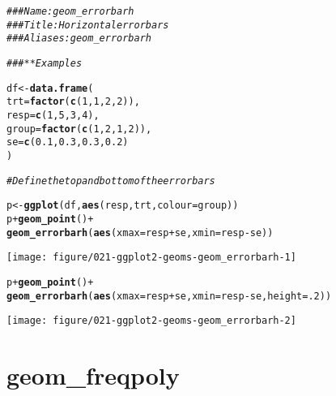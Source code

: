 \documentclass[a4paper,titlepage]{tufte-handout}\usepackage[]{graphicx}\usepackage[]{color}
\makeatletter
\def\maxwidth{ %
  \ifdim\Gin@nat@width>\linewidth
    \linewidth
  \else
    \Gin@nat@width
  \fi
}
\newcommand{\hlnum}[1]{\textcolor[rgb]{0.686,0.059,0.569}{#1}}%
\newcommand{\hlcom}[1]{\textcolor[rgb]{0.678,0.584,0.686}{\textit{#1}}}%
\newcommand{\hlopt}[1]{\textcolor[rgb]{0,0,0}{#1}}%
\newcommand{\hlstd}[1]{\textcolor[rgb]{0.345,0.345,0.345}{#1}}%
\newcommand{\hlkwb}[1]{\textcolor[rgb]{0.69,0.353,0.396}{#1}}%
\newcommand{\hlkwc}[1]{\textcolor[rgb]{0.333,0.667,0.333}{#1}}%
\newcommand{\hlkwd}[1]{\textcolor[rgb]{0.737,0.353,0.396}{\textbf{#1}}}%
\newenvironment{kframe}{%
 \def\at@end@of@kframe{}%
 \ifinner\ifhmode%
  \def\at@end@of@kframe{\end{minipage}}%
  \begin{minipage}{\columnwidth}%
 \fi\fi%
 \def\FrameCommand##1{\hskip\@totalleftmargin \hskip-\fboxsep
 \colorbox{shadecolor}{##1}\hskip-\fboxsep
     \hskip-\linewidth \hskip-\@totalleftmargin \hskip\columnwidth}%
 \MakeFramed {\advance\hsize-\width
   \@totalleftmargin\z@ \linewidth\hsize
   \@setminipage}}%
 {\par\unskip\endMakeFramed%
 \at@end@of@kframe}
\newenvironment{knitrout}{}{} %
\makeatother
\begin{document}
\begin{knitrout}
\color{fgcolor}\begin{kframe}
\begin{alltt}
\hlcom{### Name: geom_errorbarh}
\hlcom{### Title: Horizontal error bars}
\hlcom{### Aliases: geom_errorbarh}

\hlcom{### ** Examples}

\hlstd{df} \hlkwb{<-} \hlkwd{data.frame}\hlstd{(}
  \hlkwc{trt} \hlstd{=} \hlkwd{factor}\hlstd{(}\hlkwd{c}\hlstd{(}\hlnum{1}\hlstd{,} \hlnum{1}\hlstd{,} \hlnum{2}\hlstd{,} \hlnum{2}\hlstd{)),}
  \hlkwc{resp} \hlstd{=} \hlkwd{c}\hlstd{(}\hlnum{1}\hlstd{,} \hlnum{5}\hlstd{,} \hlnum{3}\hlstd{,} \hlnum{4}\hlstd{),}
  \hlkwc{group} \hlstd{=} \hlkwd{factor}\hlstd{(}\hlkwd{c}\hlstd{(}\hlnum{1}\hlstd{,} \hlnum{2}\hlstd{,} \hlnum{1}\hlstd{,} \hlnum{2}\hlstd{)),}
  \hlkwc{se} \hlstd{=} \hlkwd{c}\hlstd{(}\hlnum{0.1}\hlstd{,} \hlnum{0.3}\hlstd{,} \hlnum{0.3}\hlstd{,} \hlnum{0.2}\hlstd{)}
\hlstd{)}

\hlcom{# Define the top and bottom of the errorbars}

\hlstd{p} \hlkwb{<-} \hlkwd{ggplot}\hlstd{(df,} \hlkwd{aes}\hlstd{(resp, trt,} \hlkwc{colour} \hlstd{= group))}
\hlstd{p} \hlopt{+} \hlkwd{geom_point}\hlstd{()} \hlopt{+}
  \hlkwd{geom_errorbarh}\hlstd{(}\hlkwd{aes}\hlstd{(}\hlkwc{xmax} \hlstd{= resp} \hlopt{+} \hlstd{se,} \hlkwc{xmin} \hlstd{= resp} \hlopt{-} \hlstd{se))}
\end{alltt}
\end{kframe}
\texttt{[image: figure/021-ggplot2-geoms-geom\_errorbarh-1]} 
\begin{kframe}\begin{alltt}
\hlstd{p} \hlopt{+} \hlkwd{geom_point}\hlstd{()} \hlopt{+}
  \hlkwd{geom_errorbarh}\hlstd{(}\hlkwd{aes}\hlstd{(}\hlkwc{xmax} \hlstd{= resp} \hlopt{+} \hlstd{se,} \hlkwc{xmin} \hlstd{= resp} \hlopt{-} \hlstd{se,} \hlkwc{height} \hlstd{=} \hlnum{.2}\hlstd{))}
\end{alltt}
\end{kframe}
\texttt{[image: figure/021-ggplot2-geoms-geom\_errorbarh-2]} 

\end{knitrout}


\section{geom\_freqpoly}
\end{document}
